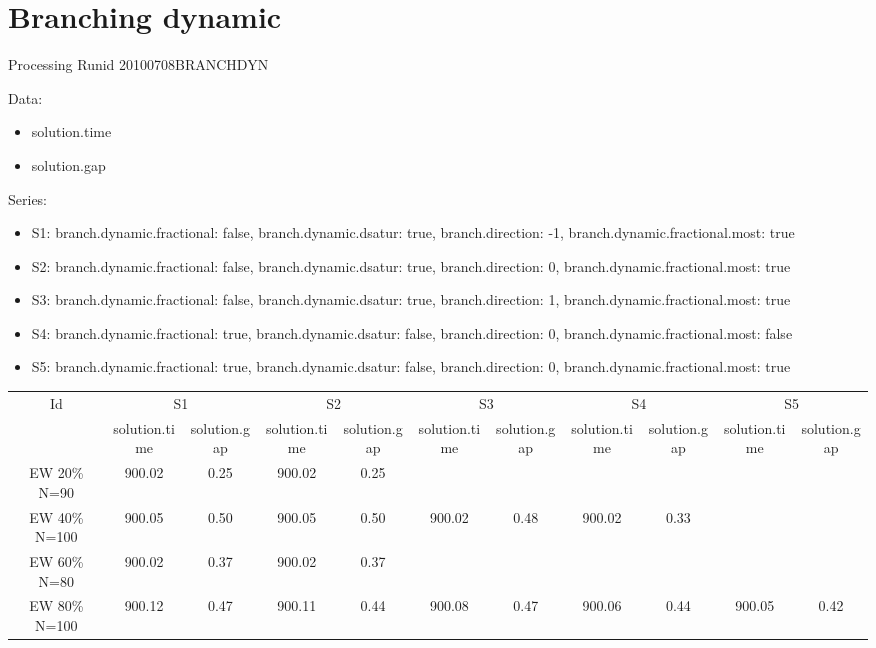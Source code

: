 \documentclass[landscape, 12pt]{report}
\begin{document}
	
	\section{Branching dynamic}
	
	Processing Runid 20100708BRANCHDYN

Data:
\begin{itemize}
\item solution.time
\item solution.gap
\end{itemize}

Series:
\begin{itemize}
\item S1: branch.dynamic.fractional: false, branch.dynamic.dsatur: true, branch.direction: -1, branch.dynamic.fractional.most: true
\item S2: branch.dynamic.fractional: false, branch.dynamic.dsatur: true, branch.direction: 0, branch.dynamic.fractional.most: true
\item S3: branch.dynamic.fractional: false, branch.dynamic.dsatur: true, branch.direction: 1, branch.dynamic.fractional.most: true
\item S4: branch.dynamic.fractional: true, branch.dynamic.dsatur: false, branch.direction: 0, branch.dynamic.fractional.most: false
\item S5: branch.dynamic.fractional: true, branch.dynamic.dsatur: false, branch.direction: 0, branch.dynamic.fractional.most: true
\end{itemize}
\begin{tabular}{|c|cc|cc|cc|cc|cc|}
\hline
\multicolumn{1}{|c|}{Id} & \multicolumn{2}{|c|}{S1} & \multicolumn{2}{|c|}{S2} & \multicolumn{2}{|c|}{S3} & \multicolumn{2}{|c|}{S4} & \multicolumn{2}{|c|}{S5}
\\
 & solution.time & solution.gap & solution.time & solution.gap & solution.time & solution.gap & solution.time & solution.gap & solution.time & solution.gap
\\
\hline
EW 20\% N=90 & 900.02 & 0.25 & 900.02 & 0.25
\\
EW 40\% N=100 & 900.05 & 0.50 & 900.05 & 0.50 & 900.02 & 0.48 & 900.02 & 0.33
\\
EW 60\% N=80 & 900.02 & 0.37 & 900.02 & 0.37
\\
EW 80\% N=100 & 900.12 & 0.47 & 900.11 & 0.44 & 900.08 & 0.47 & 900.06 & 0.44 & 900.05 & 0.42
\\
\hline 
 \end{tabular}
	\clearpage
	
\end{document}
